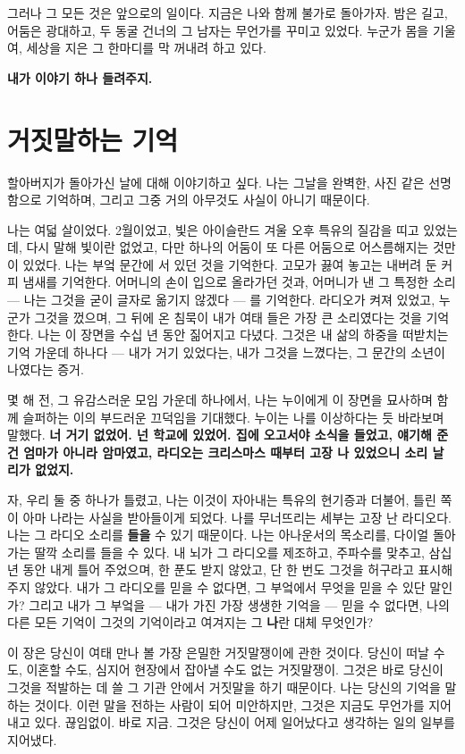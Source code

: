 그러나 그 모든 것은 앞으로의 일이다. 지금은 나와 함께 불가로 돌아가자. 밤은 길고, 어둠은 광대하고, 두 동굴 건너의 그 남자는 무언가를 꾸미고 있었다. 누군가 몸을 기울여, 세상을 지은 그 한마디를 막 꺼내려 하고 있다.

\textbf{내가 이야기 하나 들려주지.}

\chapter{거짓말하는 기억}

할아버지가 돌아가신 날에 대해 이야기하고 싶다. 나는 그날을 완벽한, 사진 같은 선명함으로 기억하며, 그리고 그중 거의 아무것도 사실이 아니기 때문이다.

나는 여덟 살이었다. 2월이었고, 빛은 아이슬란드 겨울 오후 특유의 질감을 띠고 있었는데, 다시 말해 빛이란 없었고, 다만 하나의 어둠이 또 다른 어둠으로 어스름해지는 것만이 있었다. 나는 부엌 문간에 서 있던 것을 기억한다. 고모가 끓여 놓고는 내버려 둔 커피 냄새를 기억한다. 어머니의 손이 입으로 올라가던 것과, 어머니가 낸 그 특정한 소리 — 나는 그것을 굳이 글자로 옮기지 않겠다 — 를 기억한다. 라디오가 켜져 있었고, 누군가 그것을 껐으며, 그 뒤에 온 침묵이 내가 여태 들은 가장 큰 소리였다는 것을 기억한다. 나는 이 장면을 수십 년 동안 짊어지고 다녔다. 그것은 내 삶의 하중을 떠받치는 기억 가운데 하나다 — 내가 거기 있었다는, 내가 그것을 느꼈다는, 그 문간의 소년이 나였다는 증거.

몇 해 전, 그 유감스러운 모임 가운데 하나에서, 나는 누이에게 이 장면을 묘사하며 함께 슬퍼하는 이의 부드러운 끄덕임을 기대했다. 누이는 나를 이상하다는 듯 바라보며 말했다. \textbf{너 거기 없었어. 넌 학교에 있었어. 집에 오고서야 소식을 들었고, 얘기해 준 건 엄마가 아니라 암마였고, 라디오는 크리스마스 때부터 고장 나 있었으니 소리 날 리가 없었지.}

자, 우리 둘 중 하나가 틀렸고, 나는 이것이 자아내는 특유의 현기증과 더불어, 틀린 쪽이 아마 나라는 사실을 받아들이게 되었다. 나를 무너뜨리는 세부는 고장 난 라디오다. 나는 그 라디오 소리를 \textbf{들을} 수 있기 때문이다. 나는 아나운서의 목소리를, 다이얼 돌아가는 딸깍 소리를 들을 수 있다. 내 뇌가 그 라디오를 제조하고, 주파수를 맞추고, 삼십 년 동안 내게 틀어 주었으며, 한 푼도 받지 않았고, 단 한 번도 그것을 허구라고 표시해 주지 않았다. 내가 그 라디오를 믿을 수 없다면, 그 부엌에서 무엇을 믿을 수 있단 말인가? 그리고 내가 그 부엌을 — 내가 가진 가장 생생한 기억을 — 믿을 수 없다면, 나의 다른 모든 기억이 그것의 기억이라고 여겨지는 그 \textbf{나}란 대체 무엇인가?

이 장은 당신이 여태 만나 볼 가장 은밀한 거짓말쟁이에 관한 것이다. 당신이 떠날 수도, 이혼할 수도, 심지어 현장에서 잡아낼 수도 없는 거짓말쟁이. 그것은 바로 당신이 그것을 적발하는 데 쓸 그 기관 안에서 거짓말을 하기 때문이다. 나는 당신의 기억을 말하는 것이다. 이런 말을 전하는 사람이 되어 미안하지만, 그것은 지금도 무언가를 지어내고 있다. 끊임없이. 바로 지금. 그것은 당신이 어제 일어났다고 생각하는 일의 일부를 지어냈다.

